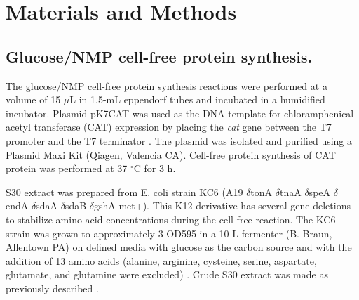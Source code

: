 \documentclass[journal=asbcd6,manuscript=article]{achemso}
\begin{document}
\clearpage

\section*{Materials and Methods}

\subsection*{Glucose/NMP cell-free protein synthesis.}
The glucose/NMP cell-free protein synthesis reactions were performed at a volume of 15 $\mu$L in 1.5-mL eppendorf tubes and incubated in a humidified incubator.
Plasmid pK7CAT was used as the DNA template for chloramphenical acetyl transferase (CAT) expression by placing the \emph{cat} gene between the T7 promoter and the T7 terminator \cite{Kigawa1995}.
The plasmid was isolated and purified using a Plasmid Maxi Kit (Qiagen, Valencia CA).
Cell-free protein synthesis of CAT protein was performed at 37 $^{\circ}$C for 3 h.

S30 extract was prepared from E. coli strain KC6 (A19 $\delta$tonA $\delta$tnaA $\delta$speA $\delta$endA $\delta$sdaA $\delta$sdaB $\delta$gshA met+).
This K12-derivative has several gene deletions to stabilize amino acid concentrations during the cell-free reaction.
The KC6 strain was grown to approximately 3 OD595 in a 10-L fermenter (B. Braun, Allentown PA) on defined media with glucose as the carbon source and with the addition of 13 amino acids (alanine, arginine, cysteine, serine, aspartate, glutamate, and glutamine were excluded) \cite{Zawada:2003}.
Crude S30 extract was made as previously described \cite{Jewett:2002}.
\end{document}

